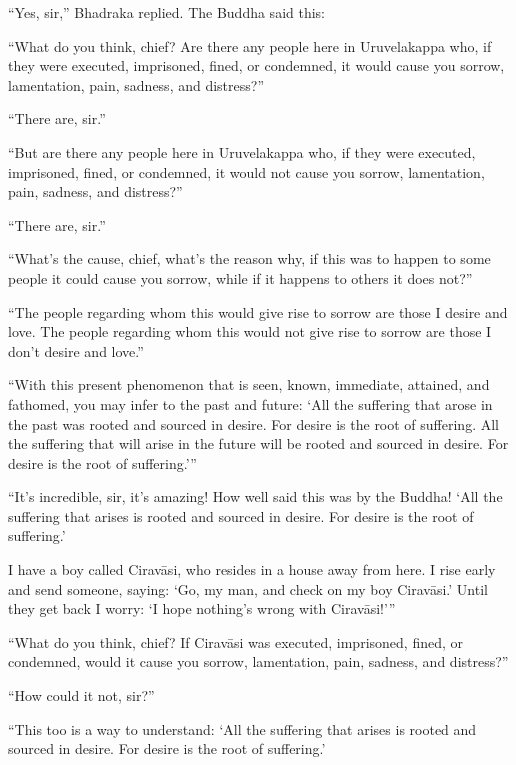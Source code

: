 \documentclass[12pt,openany]{book}%
\begin{document}
“Yes, sir,” Bhadraka replied. The Buddha said this: 

“What do you think, chief? Are there any people here in Uruvelakappa who, if they were executed, imprisoned, fined, or condemned, it would cause you sorrow, lamentation, pain, sadness, and distress?” 

“There are, sir.” 

“But are there any people here in Uruvelakappa who, if they were executed, imprisoned, fined, or condemned, it would not cause you sorrow, lamentation, pain, sadness, and distress?” 

“There are, sir.” 

“What’s the cause, chief, what’s the reason why, if this was to happen to some people it could cause you sorrow, while if it happens to others it does not?” 

“The people regarding whom this would give rise to sorrow are those I desire and love. The people regarding whom this would not give rise to sorrow are those I don’t desire and love.” 

“With this present phenomenon that is seen, known, immediate, attained, and fathomed, you may infer to the past and future: ‘All the suffering that arose in the past was rooted and sourced in desire. For desire is the root of suffering. All the suffering that will arise in the future will be rooted and sourced in desire. For desire is the root of suffering.’” 

“It’s incredible, sir, it’s amazing! How well said this was by the Buddha! ‘All the suffering that arises is rooted and sourced in desire. For desire is the root of suffering.’ 

I have a boy called \textsanskrit{Ciravāsi}, who resides in a house away from here. I rise early and send someone, saying: ‘Go, my man, and check on my boy \textsanskrit{Ciravāsi}.’ Until they get back I worry: ‘I hope nothing’s wrong with \textsanskrit{Ciravāsi}!’” 

“What do you think, chief? If \textsanskrit{Ciravāsi} was executed, imprisoned, fined, or condemned, would it cause you sorrow, lamentation, pain, sadness, and distress?” 

“How could it not, sir?” 

“This too is a way to understand: ‘All the suffering that arises is rooted and sourced in desire. For desire is the root of suffering.’ 
\end{document}

